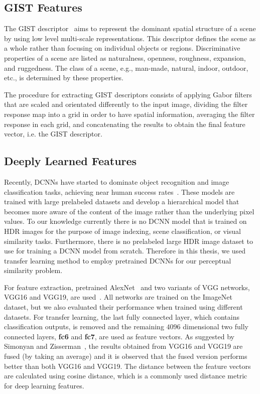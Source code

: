 \subsection{GIST Features}
The GIST descriptor~\cite{oliva2001modeling} aims to represent the dominant spatial structure of a scene by using low level multi-scale representations. This descriptor defines the scene as a whole rather than focusing on individual objects or regions. Discriminative properties of a scene are listed as naturalness, openness, roughness, expansion, and ruggedness. The class of a scene, e.g., man-made, natural, indoor, outdoor, etc., is determined by these properties.

The procedure for extracting GIST descriptors consists of applying Gabor filters that are scaled and orientated differently to the input image, dividing the filter response map into a grid in order to have spatial information, averaging the filter response in each grid, and concatenating the results to obtain the final feature vector, i.e. the GIST descriptor.

\subsection{Deeply Learned Features}
Recently, DCNNs have started to dominate object recognition and image classification tasks, achieving near human success rates~\cite{krizhevsky2012imagenet,simonyan2014very,zhou2017scene}. These models are trained with large prelabeled datasets and develop a hierarchical model that becomes more aware of the content of the image rather than the underlying pixel values. To our knowledge currently there is no DCNN model that is trained on HDR images for the purpose of image indexing, scene classification, or visual similarity tasks.
Furthermore, there is no prelabeled large HDR image dataset to use for training a DCNN model from scratch. Therefore in this thesis, we used transfer learning method to employ pretrained DCNNs for our perceptual similarity problem. 

For feature extraction, pretrained AlexNet~\cite{krizhevsky2012imagenet} and two variants of VGG networks, VGG16 and VGG19, are used~\cite{simonyan2014very}. All networks are trained on the ImageNet~\cite{russakovsky2015imagenet} dataset, but we also evaluated their performance when trained using different datasets. For transfer learning, the last fully connected layer, which contains classification outputs, is removed and the remaining $4096$ dimensional two fully connected layers, \textbf{fc6} and \textbf{fc7}, are used as feature vectors. As suggested by Simonyan and Zisserman~\cite{simonyan2014very}, the results obtained from VGG16 and VGG19 are fused (by taking an average) and it is observed that the fused version performs better than both VGG16 and VGG19. The distance between the feature vectors are calculated using cosine distance, which is a commonly used distance metric for deep learning features. 

